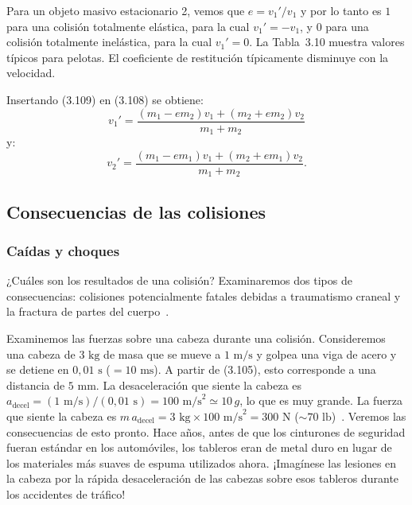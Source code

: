 \documentclass[12pt]{book}
\begin{document}
Para un objeto masivo estacionario 2, vemos que $e = v_1'/v_1$ y por lo tanto es $1$ para una colisión totalmente elástica, para la cual $v_1' = -v_1$, y $0$ para una colisión totalmente inelástica, para la cual $v_1' = 0$. La Tabla~3.10 muestra valores típicos para pelotas. El coeficiente de restitución típicamente disminuye con la velocidad.

Insertando (3.109) en (3.108) se obtiene:
\begin{equation}
v_1' = \frac{(m_1 - e m_2)v_1 + (m_2 + e m_2)v_2}{m_1 + m_2}
\label{eq:3.110}
\end{equation}
y:
\begin{equation}
v_2' = \frac{(m_1 - e m_1)v_1 + (m_2 + e m_1)v_2}{m_1 + m_2}.
\label{eq:3.111}
\end{equation}

\subsection{Consecuencias de las colisiones}

\subsubsection*{Caídas y choques}

¿Cuáles son los resultados de una colisión? Examinaremos dos tipos de consecuencias: colisiones potencialmente fatales debidas a traumatismo craneal y la fractura de partes del cuerpo~\cite{ref106,ref131}.

Examinemos las fuerzas sobre una cabeza durante una colisión. Consideremos una cabeza de $3\text{ kg}$ de masa que se mueve a $1\text{ m/s}$ y golpea una viga de acero y se detiene en $0{,}01\text{ s}$ ($= 10\text{ ms}$). A partir de (3.105), esto corresponde a una distancia de $5\text{ mm}$. La desaceleración que siente la cabeza es $a_{\text{decel}} = (1\text{ m/s})/(0{,}01\text{ s}) = 100\text{ m/s}^2 \simeq 10\,g$, lo que es muy grande. La fuerza que siente la cabeza es $m\,a_{\text{decel}} = 3\text{ kg} \times 100\text{ m/s}^2 = 300\text{ N}$ ($\sim 70\text{ lb}$)~\cite{ref20}. Veremos las consecuencias de esto pronto. Hace años, antes de que los cinturones de seguridad fueran estándar en los automóviles, los tableros eran de metal duro en lugar de los materiales más suaves de espuma utilizados ahora. ¡Imagínese las lesiones en la cabeza por la rápida desaceleración de las cabezas sobre esos tableros durante los accidentes de tráfico!
\end{document}
